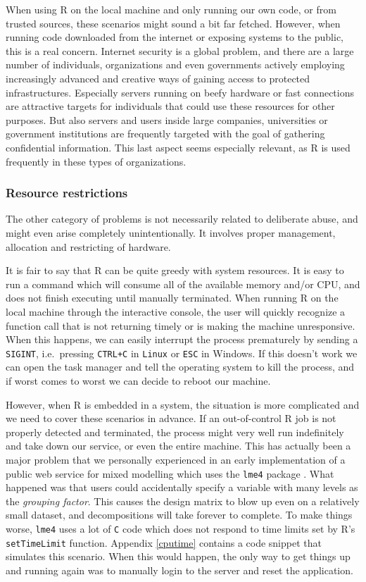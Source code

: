 \documentclass{jss}
\newcommand{\R}{\textsf{R}\xspace}
\newcommand{\Linux}{\texttt{Linux}\xspace}
\begin{document}
When using \R on the local machine and only running our own code, or from
trusted sources, these scenarios might sound a bit far fetched. However, when
running code downloaded from the internet or exposing systems to the public,
this is a real concern. Internet security is a global problem, and there are a
large number of individuals, organizations and even governments actively
employing increasingly advanced and creative ways of gaining access to protected
infrastructures. Especially servers running on beefy hardware or fast
connections are attractive targets for individuals that could use these
resources for other purposes. But also servers and users inside large companies,
universities or government institutions are frequently targeted with the goal of
gathering confidential information. This last aspect seems especially relevant,
as \R is used frequently in these types of organizations.

\subsubsection{Resource restrictions}

The other category of problems is not necessarily related to deliberate abuse,
and might even arise completely unintentionally. It involves proper management,
allocation and restricting of hardware.

It is fair to say that \R can be quite greedy with system resources. It is easy
to run a command which will consume all of the available memory and/or CPU, and
does not finish executing until manually terminated. When running \R on the
local machine through the interactive console, the user will quickly recognize a
function call that is not returning timely or is making the machine
unresponsive. When this happens, we can easily interrupt the process prematurely
by sending a \texttt{SIGINT}, i.e.\ pressing \texttt{CTRL+C} in \Linux or
\texttt{ESC} in Windows. If this doesn't work we can open the task manager and
tell the operating system to kill the process, and if worst comes to worst we
can decide to reboot our machine.

However, when \R is embedded in a system, the situation is more complicated and
we need to cover these scenarios in advance. If an out-of-control \R job is not
properly detected and terminated, the process might very well run indefinitely
and take down our service, or even the entire machine. This has actually been a
major problem that we personally experienced in an early implementation of a
public web service for mixed modelling \citep{yeroonlme4} which uses the
\texttt{lme4} package \citep{lme4}. What happened was that users could
accidentally specify a variable with many levels as the \emph{grouping factor}.
This causes the design matrix to blow up even on a relatively small dataset, and
decompositions will take forever to complete. To make things worse,
\texttt{lme4} uses a lot of \texttt{C} code which does not respond to time
limits set by R's \texttt{setTimeLimit} function. Appendix \ref{cputime}
contains a code snippet that simulates this scenario. When this would happen,
the only way to get things up and running again was to manually login to the
server and reset the application.
\end{document}
